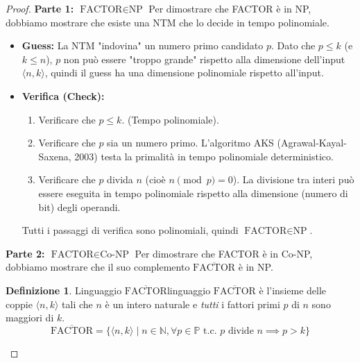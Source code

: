 \documentclass[a4paper]{article}
\theoremstyle{definition} %
\newtheorem{definition}{Definizione}
\begin{document}
\begin{proof}
\textbf{Parte 1: $\text{FACTOR} \in \text{NP}$}
Per dimostrare che FACTOR è in NP, dobbiamo mostrare che esiste una NTM che lo decide in tempo polinomiale.
\begin{itemize}
    \item \textbf{Guess:} La NTM "indovina" un numero primo candidato $p$. Dato che $p \le k$ (e $k \le n$), $p$ non può essere "troppo grande" rispetto alla dimensione dell'input $\langle n, k \rangle$, quindi il guess ha una dimensione polinomiale rispetto all'input.
    \item \textbf{Verifica (Check):}
    \begin{enumerate}
        \item Verificare che $p \le k$. (Tempo polinomiale).
        \item Verificare che $p$ sia un numero primo. L'algoritmo AKS (Agrawal-Kayal-Saxena, 2003) testa la primalità in tempo polinomiale deterministico.
        \item Verificare che $p$ divida $n$ (cioè $n \pmod p = 0$). La divisione tra interi può essere eseguita in tempo polinomiale rispetto alla dimensione (numero di bit) degli operandi.
    \end{enumerate}
    Tutti i passaggi di verifica sono polinomiali, quindi $\text{FACTOR} \in \text{NP}$.
\end{itemize}

\textbf{Parte 2: $\text{FACTOR} \in \text{Co-NP}$}
Per dimostrare che FACTOR è in Co-NP, dobbiamo mostrare che il suo complemento $\overline{\text{FACTOR}}$ è in NP.

\begin{definition}{Linguaggio $\overline{\text{FACTOR}}$}{linguaggio}
$\overline{\text{FACTOR}}$ è l'insieme delle coppie $\langle n, k \rangle$ tali che $n$ è un intero naturale e \textit{tutti} i fattori primi $p$ di $n$ sono maggiori di $k$.
\[
\overline{\text{FACTOR}} = \{ \langle n, k \rangle \mid n \in \mathbb{N}, \forall p \in \mathbb{P} \text{ t.c. } p \text{ divide } n \implies p > k \}
\]
\end{definition}


\end{proof}
\end{document}
